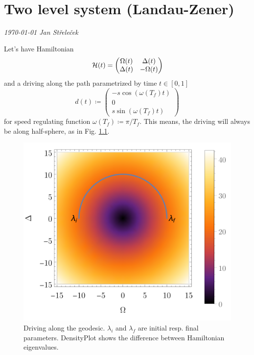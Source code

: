 \chapter{Two level system (Landau-Zener)}
\textit{\today\newline
Jan Střeleček\newline}

Let's have Hamiltonian
\begin{equation}
    \mathcal{H}(t)=\begin{pmatrix}
        \Omega(t)&\Delta(t)\\
        \Delta(t)&-\Omega(t)
    \end{pmatrix}
\end{equation}
and a driving along the path parametrized by time $t\in[0,1]$
\begin{equation}
    d(t)\coloneqq \begin{pmatrix}
        -s \cos(\omega(T_f)t)\\
        0\\
        s \sin(\omega(T_f)t)
    \end{pmatrix}
\end{equation}
for speed regulating function $\omega(T_f)\coloneqq \pi/T_f$. This means, the driving will always be along half-sphere, as in Fig. \ref{fig:driving}.

\begin{figure}[H]
    \centering
    \includegraphics[scale=1.2]{../img/driving.pdf}
    \caption{Driving along the geodesic. $\lambda_i$ and $\lambda_f$ are initial resp. final parameters. DensityPlot shows the difference between Hamiltonian eigenvalues.}
    \label{fig:driving}
\end{figure}

